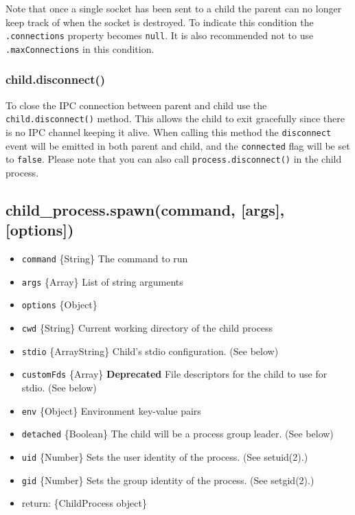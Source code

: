 Note that once a single socket has been sent to a child the parent can
no longer keep track of when the socket is destroyed. To indicate this
condition the \texttt{.connections} property becomes \texttt{null}. It
is also recommended not to use \texttt{.maxConnections} in this
condition.

\subsubsection{child.disconnect()}

To close the IPC connection between parent and child use the
\texttt{child.disconnect()} method. This allows the child to exit
gracefully since there is no IPC channel keeping it alive. When calling
this method the \texttt{disconnect} event will be emitted in both parent
and child, and the \texttt{connected} flag will be set to
\texttt{false}. Please note that you can also call
\texttt{process.disconnect()} in the child process.

\subsection{child\_process.spawn(command, {[}args{]}, {[}options{]})}

\begin{itemize}
\item
  \texttt{command} \{String\} The command to run
\item
  \texttt{args} \{Array\} List of string arguments
\item
  \texttt{options} \{Object\}
\item
  \texttt{cwd} \{String\} Current working directory of the child process
\item
  \texttt{stdio} \{Array\textbar{}String\} Child's stdio configuration.
  (See below)
\item
  \texttt{customFds} \{Array\} \textbf{Deprecated} File descriptors for
  the child to use for stdio. (See below)
\item
  \texttt{env} \{Object\} Environment key-value pairs
\item
  \texttt{detached} \{Boolean\} The child will be a process group
  leader. (See below)
\item
  \texttt{uid} \{Number\} Sets the user identity of the process. (See
  setuid(2).)
\item
  \texttt{gid} \{Number\} Sets the group identity of the process. (See
  setgid(2).)
\item
  return: \{ChildProcess object\}
\end{itemize}

